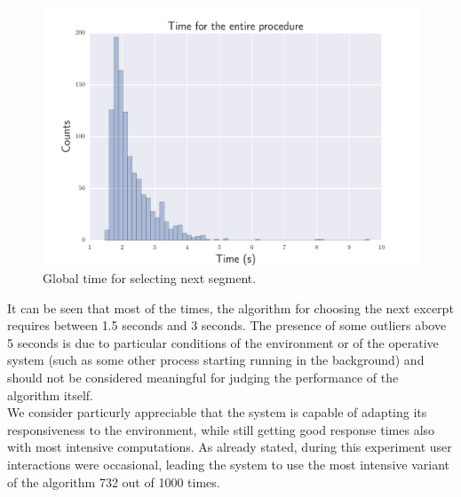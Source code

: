 \begin{figure}[h]
\begin{center}
\includegraphics[scale=0.7]{Figures/bench_procedure.pdf}
  \caption[Global time for selecting next segment]{Global time for selecting next segment.}
  \label{fig:step7}
\end{center}
\end{figure}

It can be seen that most of the times, the algorithm for choosing the next excerpt requires between 1.5 seconds and 3 seconds. The presence of some outliers above 5 seconds is due to particular conditions of the environment or of the operative system (such as some other process starting running in the background) and should not be considered meaningful for judging the performance of the algorithm itself. \\
We consider particurly appreciable that the system is capable of adapting its responsiveness to the environment, while still getting good response times also with most intensive computations. As already stated, during this  experiment user interactions were occasional, leading the system to use the most intensive variant of the algorithm 732 out of 1000 times.\\ \\ \vspace{5cm}


